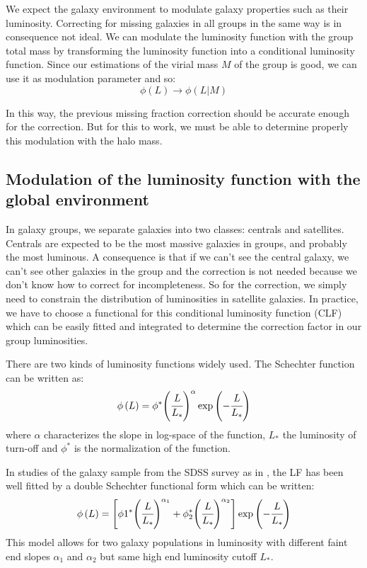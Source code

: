 We expect the galaxy environment to modulate galaxy properties such as their
luminosity. Correcting for missing galaxies in all groups in the same way is in
consequence not ideal. We can modulate the luminosity function with the group
total mass by transforming the luminosity function into a conditional
luminosity function. Since our estimations of the virial mass $M$ of the group
is good, we can use it as modulation parameter and so:
%
\begin{equation}
    \phi\left(L\right)\rightarrow\phi\left(L|M\right)
\end{equation}

In this way, the previous missing fraction correction should be accurate enough
for the correction. But for this to work, we must be able to determine properly
this modulation with the halo mass.

\subsection{Modulation of the luminosity function with the global environment}

In galaxy groups, we separate galaxies into two classes: centrals and
satellites. Centrals are expected to be the most massive galaxies in groups,
and probably the most luminous. A consequence is that if we can't see the
central galaxy, we can't see other galaxies in the group and the correction is
not needed because we don't know how to correct for incompleteness. So for the
correction, we simply need to constrain the distribution of luminosities in
satellite galaxies. In practice, we have to choose a functional for this
conditional luminosity function (CLF) which can be easily fitted and integrated
to determine the correction factor in our group luminosities.

There are two kinds of luminosity functions widely used. The Schechter function
can be written as:
%
\begin{equation}
    \phi\left(L\right)=\phi^*{\left(\cfrac{L}{L_*}\right)}^\alpha
    \exp\left(-\cfrac{L}{L_*}\right)
\end{equation}
%
where $\alpha$ characterizes the slope in log-space of the function, $L_*$ the
luminosity of turn-off and $\phi^*$ is the normalization of the function.

In studies of the galaxy sample from the SDSS survey as in \citet{Blanton+05},
the LF has been well fitted by a double Schechter functional form which can be
written:
%
\begin{equation}\label{eq:dblsch}
    \phi\left(L\right)=
    \left[\phi1^*{\left(\cfrac{L}{L_*}\right)}^{\alpha_1}+
    \phi_2^*{\left(\cfrac{L}{L_*}\right)}^{\alpha_2}\right]
    \exp\left(-\cfrac{L}{L_*}\right)
\end{equation}
%
This model allows for two galaxy populations in luminosity with different faint
end slopes $\alpha_1$ and $\alpha_2$ but same high end luminosity cutoff $L_*$.

